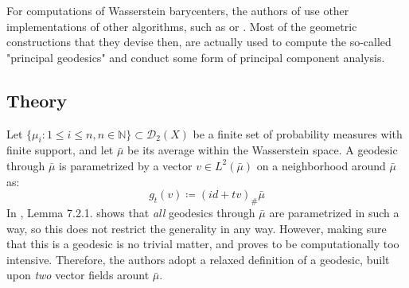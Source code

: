 \documentclass{article}
\begin{document}
For computations of Wasserstein barycenters, the authors of \cite{seguy2015principal}
use other implementations of other algorithms, such as \cite{benamou2014iterative} or 
\cite{cuturi2013fast}. Most of the geometric constructions that they devise then,
are actually used to compute the so-called "principal geodesics" and conduct 
some form of principal component analysis.

\subsection{Theory}
Let $\{\mu_i : 1\leq i\leq n, n\in \mathbb{N}\}\subset \mathscr{D}_2(X)$
be a finite set of probability measures with finite support, and let $\bar{\mu}$
be its average within the Wasserstein space. A geodesic through $\bar\mu$ is
parametrized by a vector $v\in L^2(\bar\mu)$ on a neighborhood around $\bar\mu$
as:
\[g_t(v)\coloneqq (id + tv)_\#\bar\mu \]
In \cite{ambgigli2006}, Lemma 7.2.1. shows that \textit{all} geodesics
through $\bar\mu$ are parametrized in such a way, so this does not restrict
the generality in any way. However, making sure that this is a geodesic is 
no trivial matter, and proves to be computationally too intensive. Therefore,
the authors adopt a relaxed definition of a geodesic, built upon \textit{two}
vector fields arount $\bar\mu$.
\end{document}
